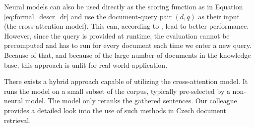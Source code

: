 Neural models can also be used directly as the scoring function as in Equation \ref{eq:formal_descr_dr} and use the document-query pair $(d,q)$ as their input (the cross-attention model).
This can, according to \citet{two-tower}, lead to better performance. However, since the query is provided at runtime, the evaluation cannot be precomputed and has to run for every document each time we enter a new query.
Because of that, and because of the large number of documents in the knowledge base, this approach is unfit for real-world application.

There exists a hybrid approach capable of utilizing the cross-attention model. 
It runs the model on a small subset of the corpus, typically pre-selected by a non-neural model.
The model only reranks the gathered sentences.
Our colleague \citet{dedkova} provides a detailed look into the use of such methods in Czech document retrieval.






